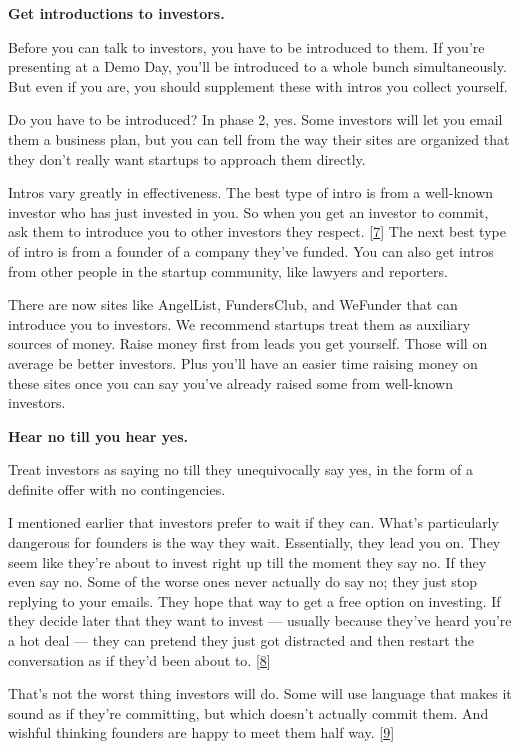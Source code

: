 \textbf{Get introductions to investors.}

Before you can talk to investors, you have to be introduced to them. If
you're presenting at a Demo Day, you'll be introduced to a whole bunch
simultaneously. But even if you are, you should supplement these with
intros you collect yourself.

Do you have to be introduced? In phase 2, yes. Some investors will let
you email them a business plan, but you can tell from the way their
sites are organized that they don't really want startups to approach
them directly.

Intros vary greatly in effectiveness. The best type of intro is from a
well-known investor who has just invested in you. So when you get an
investor to commit, ask them to introduce you to other investors they
respect. {[}\hyperref[f7n]{7}{]} The next best type of intro is from a
founder of a company they've funded. You can also get intros from other
people in the startup community, like lawyers and reporters.

There are now sites like AngelList, FundersClub, and WeFunder that can
introduce you to investors. We recommend startups treat them as
auxiliary sources of money. Raise money first from leads you get
yourself. Those will on average be better investors. Plus you'll have an
easier time raising money on these sites once you can say you've already
raised some from well-known investors.

\textbf{Hear no till you hear yes.}

Treat investors as saying no till they unequivocally say yes, in the
form of a definite offer with no contingencies.

I mentioned earlier that investors prefer to wait if they can. What's
particularly dangerous for founders is the way they wait. Essentially,
they lead you on. They seem like they're about to invest right up till
the moment they say no. If they even say no. Some of the worse ones
never actually do say no; they just stop replying to your emails. They
hope that way to get a free option on investing. If they decide later
that they want to invest --- usually because they've heard you're a hot
deal --- they can pretend they just got distracted and then restart the
conversation as if they'd been about to. {[}\hyperref[f8n]{8}{]}

That's not the worst thing investors will do. Some will use language
that makes it sound as if they're committing, but which doesn't actually
commit them. And wishful thinking founders are happy to meet them half
way. {[}\hyperref[f9n]{9}{]}

